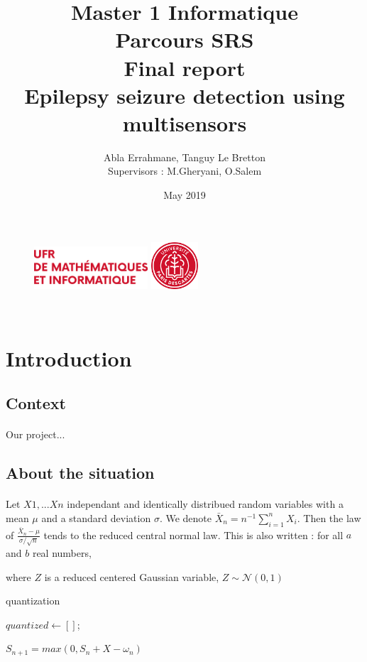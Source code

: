 \documentclass[11pt]{article}
\title{	\LARGE Master 1 Informatique \\
	Parcours SRS \\ 
	\vspace{20mm} 
\Huge	\textbf{Final report} \\ 
	\vspace{20mm} 
\Huge	\textbf{Epilepsy seizure detection using multisensors}
}
\author{Abla Errahmane, Tanguy Le Bretton \\ \vspace{5mm} Supervisors : M.Gheryani, O.Salem}
\date{May 2019}
\begin{document}
\begin{figure}[t]
	\includegraphics[width=120pt]{MI_logo.png}
	\includegraphics[width=50pt]{Descartes_logo.png}

\end{figure}

\maketitle

\newpage
~
\newpage
\tableofcontents
\newpage


\section{Introduction}
\subsection{Context}
\paragraph{}
Our project...

\subsection{About the situation}
\paragraph{}

Let $X1,...Xn$ independant and identically distribued random variables with a mean $\mu$ and a standard deviation $\sigma$. We denote $\bar{X}_n = n^{-1} \sum_{i=1}^{n}X_i$. Then the law of $\frac{\bar{X}_n- \mu}{\sigma / \sqrt{n}}$ tends to the reduced central normal law. This is also written : 
for all $a$ and $b$ real numbers, \newline

where $Z$ is a reduced centered Gaussian variable, $Z\sim \mathcal{N}(0,1)$

\begin{algorithm}
\SetAlgoLined
\DontPrintSemicolon
{}
\caption{quantization}
$quantized \gets []$;\;
\end{algorithm}
\; \newline
 \newline
$S_{n+1} = max(0,S_n+X-\omega_n)$
\end{document}
